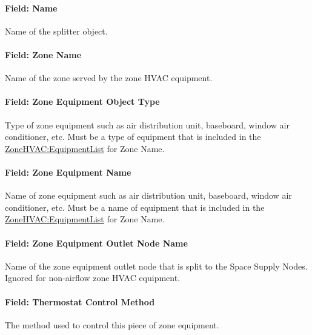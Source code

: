 \paragraph{Field: Name}\label{field-seqsplitter-name-015}

Name of the splitter object.

\paragraph{Field: Zone Name}\label{field-seqsplitter-zone-name}

Name of the zone served by the zone HVAC equipment.

\paragraph{Field: Zone Equipment Object Type}\label{field-seqsplitter-zone-equipment-object-type}

Type of zone equipment such as air distribution unit, baseboard, window air conditioner, etc. Must be a type of equipment
that is included in the \hyperref[zonehvacequipmentlist]{ZoneHVAC:EquipmentList} for Zone Name.

\paragraph{Field: Zone Equipment Name}\label{field-seqsplitter-zone-equipment-name}

Name of zone equipment such as air distribution unit, baseboard, window air conditioner, etc. Must be a name of equipment
that is included in the \hyperref[zonehvacequipmentlist]{ZoneHVAC:EquipmentList} for Zone Name.

\paragraph{Field: Zone Equipment Outlet Node Name}\label{field-seqsplitter-zone-equipment-outlet-node-name}

Name of the zone equipment outlet node that is split to the Space Supply Nodes. Ignored for non-airflow zone HVAC equipment.

\paragraph{Field: Thermostat Control Method}\label{field-seqsplitter-thermostat-control-method}

The method used to control this piece of zone equipment.

